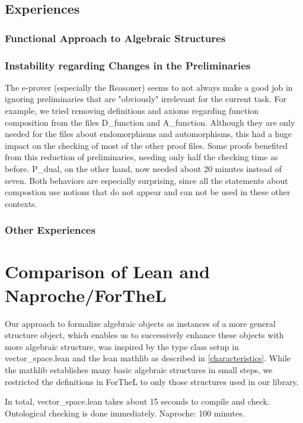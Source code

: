 \documentclass[11pt]{article}
\begin{document}
\subsection{Experiences}
\subsubsection{Functional Approach to Algebraic Structures} \label{functionalapproach}

\subsubsection{Instability regarding Changes in the Preliminaries} \label{instabilites}
The e-prover (especially the Reasoner) seems to not always make a good job in ignoring preliminaries that are "obviously" irrelevant for the current task.
For example, we tried removing definitions and axioms regarding function composition from the files D\_function and A\_function. Although they are only needed for the files about endomorphisms and automorphisms, this had a huge impact on the checking of most of the other proof files.
Some proofs benefited from this reduction of preliminaries, needing only half the checking time as before.
P\_dual, on the other hand, now needed about 20 minutes instead of seven.
Both behaviors are especially surprising, since all the statements about compostion use notions that do not appear and can not be used in these other contexts.

\subsubsection{Other Experiences}


\newpage
\section{Comparison of Lean and Naproche/ForTheL}
Our approach to formalize algebraic objects as instances of a more general {\ftl structure} object, which enables us to successively enhance these objects with more algebraic structure, was inspired by the type class setup in vector\_space.lean and the lean mathlib as described in \ref{characteristics}.
While the mathlib establishes many basic algebraic structures in small steps, we restricted the definitions in ForTheL to only those structures used in our library.

In total, vector\_space.lean takes about 15 seconds to compile and check. Ontological checking is done immediately.
Naproche: 100 minutes.
\end{document}
